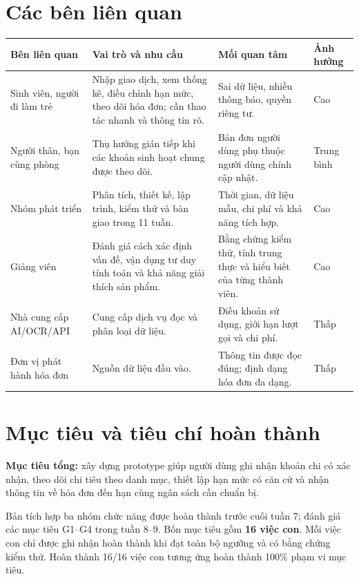 \documentclass[11pt,a4paper]{article}
\newcommand{\thead}[1]{\rowcolor{tablehead}#1\\\midrule}
\begin{document}
\section{Các bên liên quan}
\begin{longtable}{@{}P{3cm}P{5.2cm}P{5.5cm}P{1.4cm}@{}}
\toprule\thead{\textbf{Bên liên quan}&\textbf{Vai trò và nhu cầu}&\textbf{Mối quan tâm}&\textbf{Ảnh hưởng}}
\endhead
Sinh viên, người đi làm trẻ&Nhập giao dịch, xem thống kê, điều chỉnh hạn mức, theo dõi hóa đơn; cần thao tác nhanh và thông tin rõ.&Sai dữ liệu, nhiều thông báo, quyền riêng tư.&Cao\\\midrule
Người thân, bạn cùng phòng&Thụ hưởng gián tiếp khi các khoản sinh hoạt chung được theo dõi.&Bản đơn người dùng phụ thuộc người dùng chính cập nhật.&Trung bình\\\midrule
Nhóm phát triển&Phân tích, thiết kế, lập trình, kiểm thử và bàn giao trong 11 tuần.&Thời gian, dữ liệu mẫu, chi phí và khả năng tích hợp.&Cao\\\midrule
Giảng viên&Đánh giá cách xác định vấn đề, vận dụng tư duy tính toán và khả năng giải thích sản phẩm.&Bằng chứng kiểm thử, tính trung thực và hiểu biết của từng thành viên.&Cao\\\midrule
Nhà cung cấp AI/OCR/API&Cung cấp dịch vụ đọc và phân loại dữ liệu.&Điều khoản sử dụng, giới hạn lượt gọi và chi phí.&Thấp\\\midrule
Đơn vị phát hành hóa đơn&Nguồn dữ liệu đầu vào.&Thông tin được đọc đúng; định dạng hóa đơn đa dạng.&Thấp\\\bottomrule
\end{longtable}

\section{Mục tiêu và tiêu chí hoàn thành}
\textbf{Mục tiêu tổng:} xây dựng prototype giúp người dùng ghi nhận khoản chi có xác nhận, theo dõi chi tiêu theo danh mục, thiết lập hạn mức có căn cứ và nhận thông tin về hóa đơn đến hạn cùng ngân sách cần chuẩn bị.

Bản tích hợp ba nhóm chức năng được hoàn thành trước cuối tuần 7; đánh giá các mục tiêu G1--G4 trong tuần 8--9. Bốn mục tiêu gồm \textbf{16 việc con}. Mỗi việc con chỉ được ghi nhận hoàn thành khi đạt toàn bộ ngưỡng và có bằng chứng kiểm thử. Hoàn thành 16/16 việc con tương ứng hoàn thành 100\% phạm vi mục tiêu.
\end{document}
